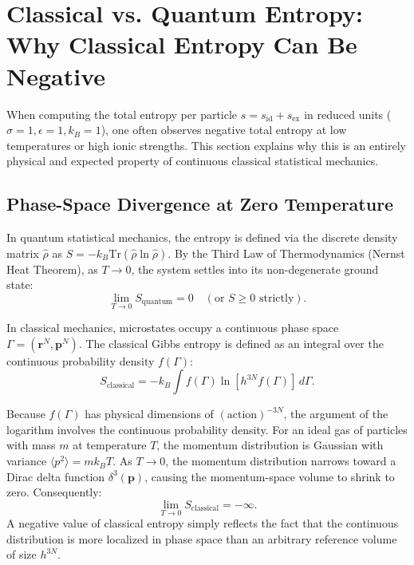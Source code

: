\documentclass[11pt,a4paper]{article}
\begin{document}
\section{Classical vs. Quantum Entropy: Why Classical Entropy Can Be Negative}

When computing the total entropy per particle $s = s_{\text{id}} + s_{\text{ex}}$ in reduced units ($\sigma=1, \epsilon=1, k_B=1$), one often observes negative total entropy at low temperatures or high ionic strengths. This section explains why this is an entirely physical and expected property of continuous classical statistical mechanics.

\subsection{Phase-Space Divergence at Zero Temperature}

In quantum statistical mechanics, the entropy is defined via the discrete density matrix $\hat{\rho}$ as $S = -k_B \mathrm{Tr}(\hat{\rho} \ln \hat{\rho})$. By the Third Law of Thermodynamics (Nernst Heat Theorem), as $T \to 0$, the system settles into its non-degenerate ground state:
\begin{equation}
\lim_{T \to 0} S_{\text{quantum}} = 0 \quad (\text{or } S \ge 0 \text{ strictly}).
\end{equation}

In classical mechanics, microstates occupy a continuous phase space $\Gamma = (\mathbf{r}^N, \mathbf{p}^N)$. The classical Gibbs entropy is defined as an integral over the continuous probability density $f(\Gamma)$:
\begin{equation}
S_{\text{classical}} = - k_B \int f(\Gamma) \ln [h^{3N} f(\Gamma)] \, d\Gamma.
\end{equation}

Because $f(\Gamma)$ has physical dimensions of $(\text{action})^{-3N}$, the argument of the logarithm involves the continuous probability density. For an ideal gas of particles with mass $m$ at temperature $T$, the momentum distribution is Gaussian with variance $\langle p^2 \rangle = m k_B T$. As $T \to 0$, the momentum distribution narrows toward a Dirac delta function $\delta^3(\mathbf{p})$, causing the momentum-space volume to shrink to zero. Consequently:
\begin{equation}
\lim_{T \to 0} S_{\text{classical}} = -\infty.
\end{equation}
A negative value of classical entropy simply reflects the fact that the continuous distribution is more localized in phase space than an arbitrary reference volume of size $h^{3N}$.
\end{document}

